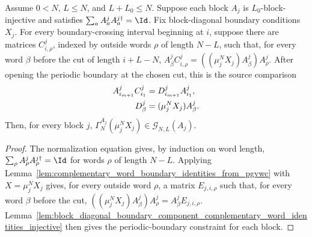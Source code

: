 \begin{lemma}
    \label{lem:block_diagonal_boundary_component_pgvwc_comparison_injective}
    \leanok
    Assume $0<N$, $L\le N$, and $L+L_0\le N$. Suppose each block $A_j$
    is $L_0$-block-injective and satisfies
    $\sum_a A^j_aA^{j\dagger}_a=\Id$. Fix block-diagonal boundary conditions
    $X_j$. For every boundary-crossing interval beginning at $i$, suppose
    there are matrices $C^j_{i,\rho}$, indexed by outside words $\rho$ of
    length $N-L$, such that, for every word $\beta$ before the cut of length
    $i+L-N$,
    $A^j_\beta C^j_{i,\rho} = ((\mu_j^NX_j)A^j_\beta)A^j_\rho$.
    After opening the periodic boundary at the chosen cut, this is the source
    comparison
    \begin{align}
        A^j_{i_{m+1}}C^j_{i_1}
         & =
        D^j_{i_{m+1}}A^j_{i_1},
        \notag \\
        D^j_\beta
         & =
        (\mu_j^NX_j)A^j_\beta.
        \notag
    \end{align}
    Then, for every block $j$,
    $\Gamma_N^{A_j}(\mu_j^NX_j) \in \mathcal G_{N,L}(A_j)$.
\end{lemma}

\begin{proof}
    \leanok
    The normalization equation gives, by induction on word length,
    $\sum_\rho A^j_\rho A^{j\dagger}_\rho = \Id$
    for words $\rho$ of length $N-L$. Applying
    Lemma~\ref{lem:complementary_word_boundary_identities_from_pgvwc} with
    $X=\mu_j^NX_j$ gives, for every outside word $\rho$, a matrix
    $E_{j,i,\rho}$ such that, for every word $\beta$ before the cut,
    $((\mu_j^NX_j)A^j_\beta)A^j_\rho = A^j_\beta E_{j,i,\rho}$.
    Lemma~\ref{lem:block_diagonal_boundary_component_complementary_word_identities_injective}
    then gives the periodic-boundary constraint for each block.
\end{proof}

